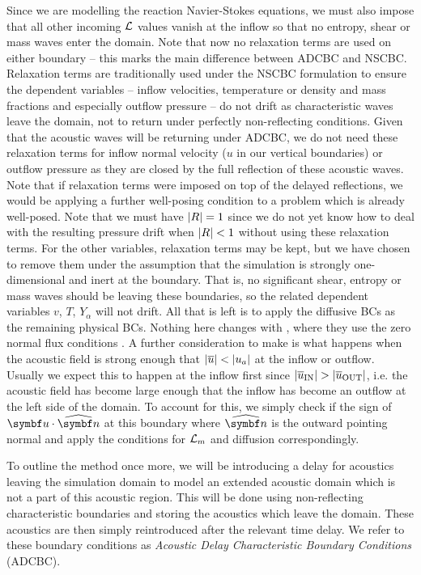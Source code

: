 Since we are modelling the reaction Navier-Stokes equations, we must also impose that all other incoming $\mathcal{L}$ values vanish at the inflow so that no entropy, shear or mass waves enter the domain. Note that now no relaxation terms are used on either boundary -- this marks the main difference between ADCBC and NSCBC. Relaxation terms are traditionally used under the NSCBC formulation to ensure the dependent variables -- inflow velocities, temperature or density and mass fractions and especially outflow pressure -- do not drift as characteristic waves leave the domain, not to return under perfectly non-reflecting conditions. Given that the acoustic waves will be returning under ADCBC, we do not need these relaxation terms for inflow normal velocity ($u$ in our vertical boundaries) or outflow pressure as they are closed by the full reflection of these acoustic waves. Note that if relaxation terms were imposed on top of the delayed reflections, we would be applying a further well-posing condition to a problem which is already well-posed. Note that we must have $\abs{R} = 1$ since we do not yet know how to deal with the resulting pressure drift when $\abs{R} < 1$ without using these relaxation terms. For the other variables, relaxation terms may be kept, but we have chosen to remove them under the assumption that the simulation is strongly one-dimensional and inert at the boundary. That is, no significant shear, entropy or mass waves should be leaving these boundaries, so the related dependent variables $v$, $T$, $Y_α$ will not drift. All that is left is to apply the diffusive BCs as the remaining physical BCs. Nothing here changes with \cite{sutherland2003ImprovedBoundaryConditions}, where they use the zero normal flux conditions . A further consideration to make is what happens when the acoustic field is strong enough that $\abs{\overline{u}} < \abs{u_a}$ at the inflow or outflow. Usually we expect this to happen at the inflow first since $\abs{\overline{u}_{\mathrm{IN}}} > \abs{\overline{u}_{\mathrm{OUT}}}$, i.e. the acoustic field has become large enough that the inflow has become an outflow at the left side of the domain. To account for this, we simply check if the sign of $\vb{u}\cdot\uvec{n}$ at this boundary where $\uvec{n}$ is the outward pointing normal and apply the conditions for $\mathcal{L}_m$ and diffusion correspondingly.

To outline the method once more, we will be introducing a delay for acoustics leaving the simulation domain to model an extended acoustic domain which is not a part of this acoustic region. This will be done using non-reflecting characteristic boundaries and storing the acoustics which leave the domain. These acoustics are then simply reintroduced after the relevant time delay. We refer to these boundary conditions as \emph{Acoustic Delay Characteristic Boundary Conditions} (ADCBC).

